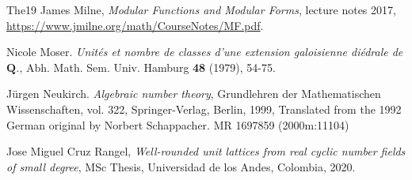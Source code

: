 \documentclass{amsart}
\newcommand{\QQ}{\mathbf{Q}}
\numberwithin{equation}{section}
\begin{document}
\begin{thebibliography}{{The}19}
 James Milne, {\em Modular Functions and Modular Forms}, lecture notes 2017, \url{https://www.jmilne.org/math/CourseNotes/MF.pdf}.

Nicole Moser. \emph{Unit\'{e}s et nombre de classes d'une extension galoisienne di\'{e}drale de $\QQ$.}, Abh. Math. Sem. Univ. Hamburg {\bf 48} (1979), 54-75.







J\"urgen Neukirch. \emph{Algebraic number theory}, Grundlehren der Mathematischen Wissenschaften, vol. 322, Springer-Verlag, Berlin, 1999, Translated from the 1992 German original by Norbert Schappacher. MR 1697859 (2000m:11104)















Jose Miguel Cruz Rangel, \emph{Well-rounded unit lattices from real cyclic number fields of small degree}, MSc Thesis, Universidad de los Andes, Colombia, 2020.


\end{thebibliography}

	
\end{document}
